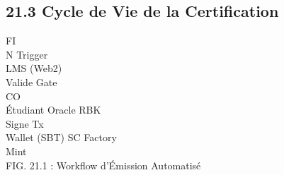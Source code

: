 \documentclass[12pt,landscape,a4paper]{article}
\begin{document}
\subsection{21.3 Cycle de Vie de la Certification}
\vspace{0.5em}
\vspace{0.5em}
\vspace{0.5em}
FI\\
N Trigger\\
LMS (Web2)\\
Valide Gate\\
CO\\
Étudiant                                           Oracle RBK\\
\vspace{0.5em}
\vspace{0.5em}
Signe Tx\\
\vspace{0.5em}
\vspace{0.5em}
Wallet (SBT)              SC Factory\\
Mint\\
\vspace{0.5em}
FIG. 21.1 : Workflow d’Émission Automatisé\\
\vspace{0.5em}
\vspace{0.5em}
\end{document}
